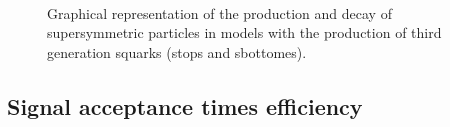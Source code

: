 \begin{figure}[h!]
    \begin{center}
        ~~
        ~~
        ~~
        \caption{
            Graphical representation of the production and decay of
            supersymmetric particles in models with the production of third
            generation squarks (stops and sbottomes).
        }
        \label{fig:simplified-models-feyn-3rdGen}
    \end{center}
\end{figure}

\clearpage
\subsection{Signal acceptance times efficiency}
\label{sec:sig-accept-contam}

